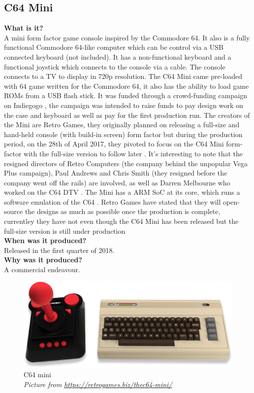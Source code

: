 \subsection{C64 Mini}
\textbf{What is it?}\\
A mini form factor game console inspired by the Commodore 64. It also is a fully functional Commodore 64-like computer which can be control via a USB connected keyboard (not included). It has a non-functional keyboard and a functional joystick which connects to the console via a cable. The console connects to a TV to display in 720p resolution. The C64 Mini came pre-loaded with 64 game written for the Commodore 64, it also has the ability to load game ROMs from a USB flash stick. It was funded through a crowd-funding campaign on Indiegogo 
\cite{RN124}, the campaign was intended to raise funds to pay design work on the case and keyboard as well as pay for the first production run. The creators of the Mini are Retro Games, they originally planned on releasing a full-size and hand-held console (with build-in screen) form factor but during the production period, on the 28th of April 2017, they pivoted to focus on the C64 Mini form-factor with the full-size version to follow later 
\cite{RN160}. It's interesting to note that the resigned directors of Retro Computers (the company behind the unpopular Vega Plus campaign), Paul Andrews and Chris Smith (they resigned before the company went off the rails) are involved, as well as Darren Melbourne who worked on the C64 DTV 
\cite{RN127}. The Mini has a ARM SoC at its core, which runs a software emulation of the C64 
\cite{RN160}. Retro Games have stated that they will open-source the designs as much as possible once the production is complete, currentley they have not even though the C64 Mini has been released but the full-size version is still under production\\

\textbf{When was it produced?}\\
Released in the first quarter of 2018. \\

\textbf{Why was it produced?}\\
A commercial endeavour. \\

\begin{figure} \begin{center}
\includegraphics[width=.3\linewidth]{pics/C64_mini} 
\end{center} 
\caption{C64 mini\\ \textit{\small{Picture from \url {https://retrogames.biz/thec64-mini/}}}}
\label{C64_mini}
\end{figure}

